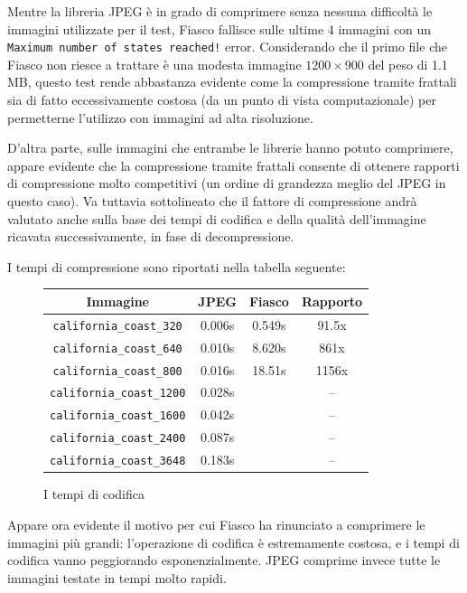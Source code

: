 \documentclass[11pt,a4paper,appendixprefix=true,numbers=noenddot]{scrreprt}
\newcommand{\nope}{\ding{55}}%
\begin{document}
Mentre la libreria JPEG è in grado di comprimere senza nessuna difficoltà le immagini utilizzate per il test, Fiasco fallisce sulle ultime 4 immagini con un \texttt{Maximum number of states reached!} error. Considerando che il primo file che Fiasco non riesce a trattare è una modesta immagine $1200 \times 900$ del peso di 1.1 MB, questo test rende abbastanza evidente come la compressione tramite frattali sia di fatto eccessivamente costosa (da un punto di vista computazionale) per permetterne l'utilizzo con immagini ad alta risoluzione. 

D'altra parte, sulle immagini che entrambe le librerie hanno potuto comprimere, appare evidente che la compressione tramite frattali consente di ottenere rapporti di compressione molto competitivi (un ordine di grandezza meglio del JPEG in questo caso). Va tuttavia sottolineato che il fattore di compressione andrà valutato anche sulla base dei tempi di codifica e della qualità dell'immagine ricavata successivamente, in fase di decompressione.

I tempi di compressione sono riportati nella tabella seguente:

\begin{figure}[!ht]
\centering
\begin{tabular}{c||cc|c}
Immagine & JPEG & Fiasco & Rapporto \\ 
\hline 
\texttt{california\_coast\_320} & 0.006s & 0.549s & 91.5x\\ 
\hline 
\texttt{california\_coast\_640} & 0.010s & 8.620s & 861x \\
\hline 
\texttt{california\_coast\_800} & 0.016s & 18.51s & 1156x \\
\hline 
\texttt{california\_coast\_1200} & 0.028s & \nope & -- \\
\hline 
\texttt{california\_coast\_1600} & 0.042s & \nope & -- \\
\hline
\texttt{california\_coast\_2400} & 0.087s & \nope & -- \\
\hline 
\texttt{california\_coast\_3648} & 0.183s & \nope & -- \\
\end{tabular} 
\caption{I tempi di codifica}
\end{figure}

Appare ora evidente il motivo per cui Fiasco ha rinunciato a comprimere le immagini più grandi: l'operazione di codifica è estremamente costosa, e i tempi di codifica vanno peggiorando esponenzialmente. JPEG comprime invece tutte le immagini testate in tempi molto rapidi.
\end{document}
